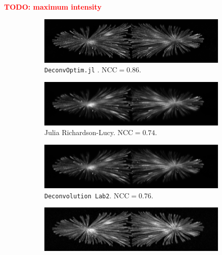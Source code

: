 \documentclass{juliacon}
\newcommand\todo[1]{\textcolor{red}{\textbf{TODO: #1}}}
\begin{document}
        \todo{maximum intensity}
        \begin{figure}[h]
            \centering
            \begin{subfigure}{.3\textwidth}
                \centering
                \includegraphics[width=\textwidth]{figures/MIPs/mip_DeconvOptim.png}
                \caption{\texttt{DeconvOptim.jl} . $\text{NCC}= 0.86$.}
            \end{subfigure}
            \begin{subfigure}{.3\textwidth}
                \centering
                \includegraphics[width=\textwidth]{figures/MIPs/mip_DeconvOptim_RL.png}
                \caption{Julia Richardson-Lucy. $\text{NCC}= 0.74$.}
            \end{subfigure}
            \begin{subfigure}{.3\textwidth}
                \centering
                \includegraphics[width=\textwidth]{figures/MIPs/mip_DeconvolutionLab2.png}
                \caption{\texttt{Deconvolution Lab2}. $\text{NCC}= 0.76$.}
            \end{subfigure}
            \begin{subfigure}{.3\textwidth}
                \centering
                \includegraphics[width=\textwidth]{figures/MIPs/mip_ThreeDeconv.png}

\end{subfigure}
\end{figure}
\end{document}
